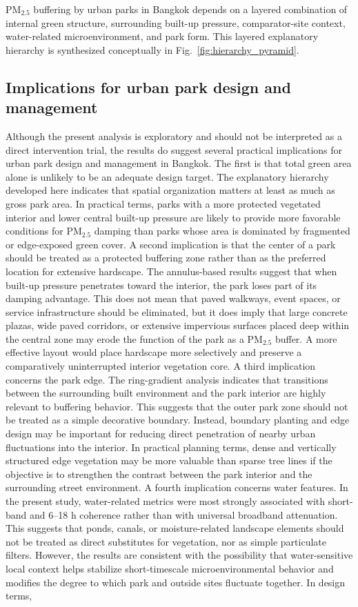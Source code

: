 PM$_{2.5}$ buffering by urban parks in Bangkok depends on a layered combination of internal green structure, surrounding built-up pressure, comparator-site context, water-related microenvironment, and park form. This layered explanatory hierarchy is synthesized conceptually in Fig.~\ref{fig:hierarchy_pyramid}.  \subsection{Implications for urban park design and management} Although the present analysis is exploratory and should not be interpreted as a direct intervention trial, the results do suggest several practical implications for urban park design and management in Bangkok. The first is that total green area alone is unlikely to be an adequate design target. The explanatory hierarchy developed here indicates that spatial organization matters at least as much as gross park area. In practical terms, parks with a more protected vegetated interior and lower central built-up pressure are likely to provide more favorable conditions for PM$_{2.5}$ damping than parks whose area is dominated by fragmented or edge-exposed green cover. A second implication is that the center of a park should be treated as a protected buffering zone rather than as the preferred location for extensive hardscape. The annulus-based results suggest that when built-up pressure penetrates toward the interior, the park loses part of its damping advantage. This does not mean that paved walkways, event spaces, or service infrastructure should be eliminated, but it does imply that large concrete plazas, wide paved corridors, or extensive impervious surfaces placed deep within the central zone may erode the function of the park as a PM$_{2.5}$ buffer. A more effective layout would place hardscape more selectively and preserve a comparatively uninterrupted interior vegetation core. A third implication concerns the park edge. The ring-gradient analysis indicates that transitions between the surrounding built environment and the park interior are highly relevant to buffering behavior. This suggests that the outer park zone should not be treated as a simple decorative boundary. Instead, boundary planting and edge design may be important for reducing direct penetration of nearby urban fluctuations into the interior. In practical planning terms, dense and vertically structured edge vegetation may be more valuable than sparse tree lines if the objective is to strengthen the contrast between the park interior and the surrounding street environment. A fourth implication concerns water features. In the present study, water-related metrics were most strongly associated with short-band and 6--18 h coherence rather than with universal broadband attenuation. This suggests that ponds, canals, or moisture-related landscape elements should not be treated as direct substitutes for vegetation, nor as simple particulate filters. However, the results are consistent with the possibility that water-sensitive local context helps stabilize short-timescale microenvironmental behavior and modifies the degree to which park and outside sites fluctuate together. In design terms, 